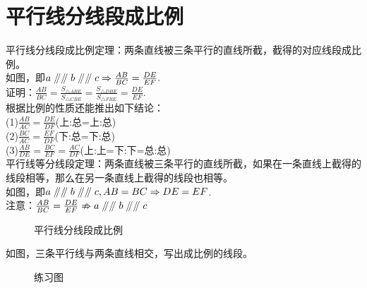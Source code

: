 \section{平行线分线段成比例}
\begin{theorem}
    平行线分线段成比例定理：两条直线被三条平行的直线所截，截得的对应线段成比例。\\
    如图，即$a\mathrel{/\mkern-5mu/}\mathrel{/\mkern-5mu/} b\mathrel{/\mkern-5mu/}\mathrel{/\mkern-5mu/} c \Rightarrow \frac{AB}{BC}=\frac{DE}{EF}.$ \\
    证明：$\frac{AB}{BC}=\frac{S_{\triangle ABE}}{S_{\triangle CBE}}=\frac{S_{\triangle DBE}}{S_{\triangle FBE}}=\frac{DE}{EF}.$ \\
    根据比例的性质还能推出如下结论：\\
    (1)$\frac{AB}{AC}=\frac{DE}{DF}$(上:总=上:总) \\
    (2)$\frac{BC}{AC}=\frac{EF}{DF}$(下:总=下:总) \\
    (3)$\frac{AB}{DE}=\frac{BC}{EF}=\frac{AC}{DF}$(上:上=下:下=总:总) \\
    平行线等分线段定理：两条直线被三条平行的直线所截，如果在一条直线上截得的线段相等，那么在另一条直线上截得的线段也相等。\\
    如图，即$a\mathrel{/\mkern-5mu/}\mathrel{/\mkern-5mu/} b\mathrel{/\mkern-5mu/}\mathrel{/\mkern-5mu/} c,AB=BC \Rightarrow DE=EF$. \\
    注意：$\frac{AB}{BC}=\frac{DE}{EF} \nRightarrow a \mathrel{/\mkern-5mu/} \mathrel{/\mkern-5mu/} b \mathrel{/\mkern-5mu/} \mathrel{/\mkern-5mu/} c$
\end{theorem}
\begin{figure}[H]
    \centering
    \resizebox{6cm}{!}{}
    \caption{平行线分线段成比例}
\end{figure}
\begin{problem}
如图，三条平行线与两条直线相交，写出成比例的线段。
\end{problem}
\begin{figure}[H]
    \centering
    \resizebox{10cm}{!}{}
    \caption{练习图}
\end{figure}
\clearpage

